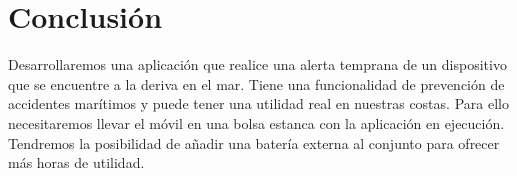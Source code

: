 \section{Conclusión}

Desarrollaremos una aplicación que realice una alerta temprana de un dispositivo que se encuentre a la deriva en el mar. Tiene una funcionalidad de prevención de accidentes marítimos y puede tener una utilidad real en nuestras costas. Para ello necesitaremos llevar el móvil en una bolsa estanca con la aplicación en ejecución. Tendremos la posibilidad de añadir una batería externa al conjunto para ofrecer más horas de utilidad.
